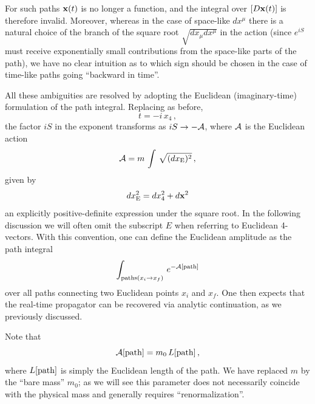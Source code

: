 \begin{figure}[h]
\centering
{}
\end{figure}

For such paths ${\bf x}(t)$ is no longer a function, and the integral over $[D{\bf x}(t)]$ is therefore invalid. Moreover, whereas in the case of space-like $dx^{\mu}$ there is a natural choice of the branch of the square root $\sqrt{dx_{\mu} dx^{\mu}}$ in the action (since $e^{iS}$ must receive exponentially small contributions from the space-like parts of the path), we have no clear intuition as to which sign should be chosen in
the case of time-like paths going ``backward in time''.

All these ambiguities are resolved by adopting the Euclidean (imaginary-time) formulation of the path integral. Replacing as before,
$$
t = -i\,x_4\,,
$$
the factor $iS$ in the exponent transforms as $i S \to -{\cal A}$, where ${\cal A}$ is the Euclidean action
$$
{\cal A} = m \,\int\,\sqrt{(dx_{\rm E})^2}\,,
$$
given by
$$
dx_{\rm E}^2 = dx_4^2 + d{\bf x}^2
$$
an explicitly positive-definite expression under the square root. In the following discussion we will often omit the subscript $E$ when referring to Euclidean 4-vectors. With this convention, one can define the Euclidean amplitude as the path integral
$$
\int_{{\rm paths}(x_i \to x_f)}\,e^{-{\cal A}[{\rm path}]}
$$
over all paths connecting two Euclidean points $x_i$ and $x_f$. One then expects that the real-time propagator can be recovered via analytic continuation, as we previously discussed.

Note that
$$
{\cal A}[{\rm path}] = m_0\,L[{\rm path}]\,,
$$
where $L[{\rm path}]$ is simply the Euclidean length of the path. We have replaced $m$ by the ``bare mass'' $m_0$; as we will see this parameter does not necessarily coincide with the physical mass and generally requires ``renormalization''.

